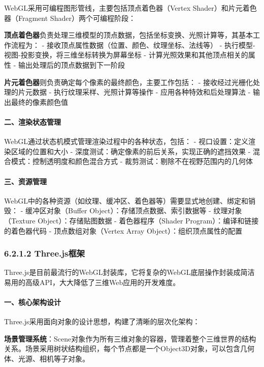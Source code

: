 WebGL采用可编程图形管线，主要包括顶点着色器（Vertex
Shader）和片元着色器（Fragment Shader）两个可编程阶段：

\textbf{顶点着色器}负责处理三维模型的顶点数据，包括坐标变换、光照计算等，其基本工作流程为：
- 接收顶点属性数据（位置、颜色、纹理坐标、法线等） -
执行模型-视图-投影变换，将三维坐标转换为屏幕坐标 -
计算光照效果和其他顶点相关的属性 - 输出处理后的顶点数据到下一阶段

\textbf{片元着色器}则负责确定每个像素的最终颜色，主要工作包括： -
接收经过光栅化处理的片元数据 - 执行纹理采样、光照计算等操作 -
应用各种特效和后处理算法 - 输出最终的像素颜色值

\paragraph{二、渲染状态管理}\label{ux4e8cux6e32ux67d3ux72b6ux6001ux7ba1ux7406}

WebGL通过状态机模式管理渲染过程中的各种状态，包括： -
视口设置：定义渲染区域的位置和大小 -
深度测试：确定像素的前后关系，实现正确的遮挡效果 -
混合模式：控制透明度和颜色混合方式 -
裁剪测试：剔除不在视野范围内的几何体

\paragraph{三、资源管理}\label{ux4e09ux8d44ux6e90ux7ba1ux7406}

WebGL中的各种资源（如纹理、缓冲区、着色器等）需要显式地创建、绑定和销毁：
- 缓冲区对象（Buffer Object）：存储顶点数据、索引数据等 -
纹理对象（Texture Object）：存储贴图数据 - 着色器程序（Shader
Program）：编译和链接的着色器代码 - 顶点数组对象（Vertex Array
Object）：组织顶点属性的配置

\subsubsection{6.2.1.2 Three.js框架}\label{three.jsux6846ux67b6}

Three.js是目前最流行的WebGL封装库，它将复杂的WebGL底层操作封装成简洁易用的高级API，大大降低了三维Web应用的开发难度。

\paragraph{一、核心架构设计}\label{ux4e00ux6838ux5fc3ux67b6ux6784ux8bbeux8ba1}

Three.js采用面向对象的设计思想，构建了清晰的层次化架构：

\textbf{场景管理系统}：Scene对象作为所有三维对象的容器，管理着整个三维世界的结构关系。场景采用树状结构组织，每个节点都是一个Object3D对象，可以包含几何体、光源、相机等子对象。

